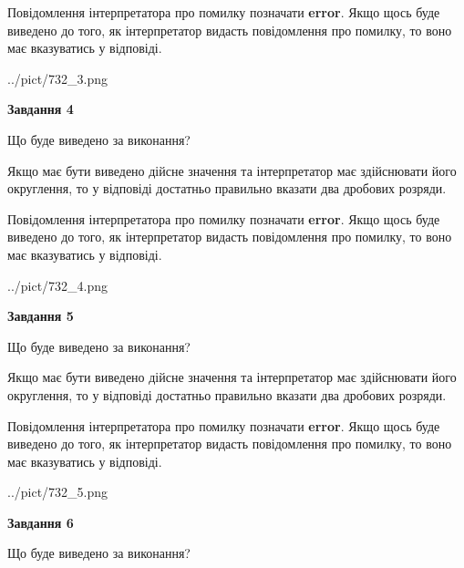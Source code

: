 \documentclass[12pt, ukrainian]{article}
\begin{document}
{\begin {Large}
Повідомлення інтерпретатора про помилку позначати \textbf{error}.
Якщо щось буде виведено до того, як інтерпретатор видасть повідомлення про помилку, 
то воно має вказуватись у відповіді. \par

\begin{center}
	{../pict/732_3.png}
\end{center}
\newpage

{\begin {center}\textbf{Завдання 4}\end {center}}\par
Що буде виведено за виконання? \par

Якщо має бути виведено дійсне значення та інтерпретатор має здійснювати його округлення, 
то у відповіді достатньо правильно вказати два дробових розряди.

Повідомлення інтерпретатора про помилку позначати \textbf{error}.
Якщо щось буде виведено до того, як інтерпретатор видасть повідомлення про помилку, 
то воно має вказуватись у відповіді. \par

\begin{center}
	{../pict/732_4.png}
\end{center}
\newpage

{\begin {center}\textbf{Завдання 5}\end {center}}\par
Що буде виведено за виконання? \par

Якщо має бути виведено дійсне значення та інтерпретатор має здійснювати його округлення, 
то у відповіді достатньо правильно вказати два дробових розряди.

Повідомлення інтерпретатора про помилку позначати \textbf{error}.
Якщо щось буде виведено до того, як інтерпретатор видасть повідомлення про помилку, 
то воно має вказуватись у відповіді. \par

\begin{center}
	{../pict/732_5.png}
\end{center}
\newpage

{\begin {center}\textbf{Завдання 6}\end {center}}\par
Що буде виведено за виконання? \par


\end{Large}}
\end{document}
